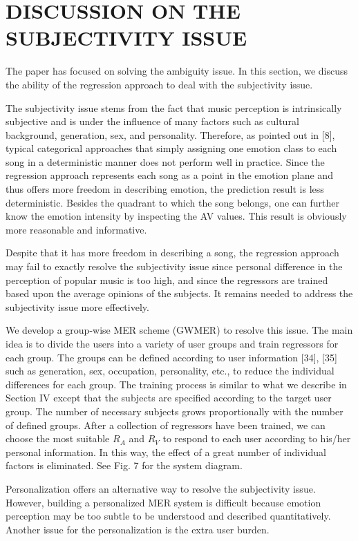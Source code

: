 \documentclass[journal, twoside]{IEEEtran}
\begin{document}
\section{DISCUSSION ON THE SUBJECTIVITY ISSUE}
The paper has focused on solving the ambiguity issue. In this
section, we discuss the ability of the regression approach to deal
with the subjectivity issue.

The subjectivity issue stems from the fact that music perception is intrinsically subjective and is under the influence of many factors such as cultural background, generation, sex, and personality. Therefore, as pointed out in [8], typical categorical approaches that simply assigning one emotion class to each song in a deterministic manner does not perform well in practice. Since the regression approach represents each song as a point in the emotion plane and thus offers more freedom in describing emotion, the prediction result is less deterministic. Besides the quadrant to which the song belongs, one can further know the
emotion intensity by inspecting the AV values. This result is obviously more reasonable and informative.

Despite that it has more freedom in describing a song, the regression approach may fail to exactly resolve the subjectivity issue since personal difference in the perception of popular music is too high, and since the regressors are trained based upon the average opinions of the subjects. It remains needed to address the subjectivity issue more effectively.

We develop a group-wise MER scheme (GWMER) to resolve this issue. The main idea is to divide the users into a variety of user groups and train regressors for each group. The groups can be defined according to user information [34], [35] such as generation, sex, occupation, personality, etc., to reduce the individual differences for each group. The training process is similar to what we describe in Section IV except that the subjects are specified according to the target user group. The number of necessary subjects grows proportionally with the number of defined groups. After a collection of regressors have been trained, we can choose the most suitable $R_A$ and $R_V$ to respond to each user according to his/her personal information. In this way, the effect of a great number of individual factors is eliminated. See Fig. 7 for the system diagram.

Personalization offers an alternative way to resolve the subjectivity issue. However, building a personalized MER system is difficult because emotion perception may be too subtle to be understood and described quantitatively. Another issue for the personalization is the extra user burden.
\end{document}
